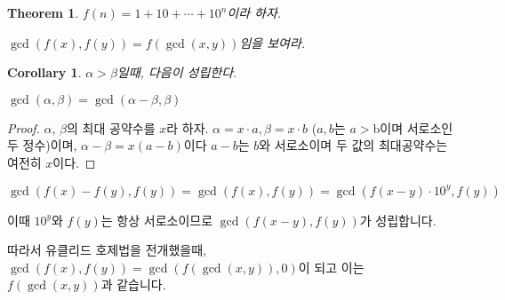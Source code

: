 \documentclass{oblivoir}
\newtheorem{theorem}{Theorem}[section]
\newtheorem{corollary}{Corollary}[section]
\begin{document}
\begin{theorem}
$f(n) = 1+10+\cdots +10^n$이라 하자.

$ \gcd(f(x) , f(y)) = f(\gcd(x,y)) $임을 보여라.
\end{theorem}
\begin{corollary}
    $\alpha > \beta$일때, 다음이 성립한다.
    
    $\gcd(\alpha ,\beta) = \gcd(\alpha-\beta , \beta)$  
\end{corollary}
\begin{proof}
    $\alpha$, $\beta$의 최대 공약수를  $x$라 하자.
    $\alpha = x \cdot a , \beta = x \cdot b$ ($a,b$는 $a>$b이며 서로소인 두 정수)이며, $\alpha -\beta = x(a-b)$이다 $a-b$는 $b$와 서로소이며 두 값의 최대공약수는 여전히 $x$이다.
\end{proof}

$\gcd(f(x)-f(y),f(y)) = \gcd(f(x),f(y)) = \gcd(f(x-y) \cdot 10^{y},f(y)) $ 

이때 $10^{y}$와 $f(y)$는 항상 서로소이므로 $\gcd(f(x-y), f(y))$가 성립합니다. %

따라서 유클리드 호제법을 전개했을때, $\gcd(f(x), f(y)) = \gcd(f(\gcd(x,y)),0)$이 되고 
이는$f(\gcd(x,y))$과 같습니다.
\end{document}
